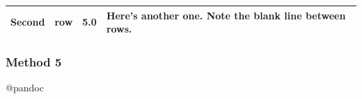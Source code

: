 \documentclass[]{article}
\begin{document}
\begin{longtable}[]{@{}clrl@{}}
\begin{minipage}[t]{0.15\columnwidth}\centering\strut
Second
\strut\end{minipage} &
\begin{minipage}[t]{0.10\columnwidth}\raggedright\strut
row
\strut\end{minipage} &
\begin{minipage}[t]{0.20\columnwidth}\raggedleft\strut
5.0
\strut\end{minipage} &
\begin{minipage}[t]{0.31\columnwidth}\raggedright\strut
Here's another one. Note the blank line between rows.
\strut\end{minipage}\tabularnewline
\bottomrule
\end{longtable}

\subsubsection{Method 5}\label{method-5}

@pandoc
\end{document}
